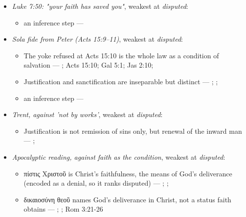 \documentclass[11pt]{article}
\begin{document}
\begin{itemize}
\begin{itemize}
\item an inference step --- \cite[Trent, Session VI (1547), canon 9]{tanner-decrees-1990}
\item an inference step --- \cite{gathercole-where-boasting-2002}; \cite{carson-variegated-nomism-1-2001}
\end{itemize}
\item \emph{Luke 7:50: "your faith has saved you"}, weakest at \emph{disputed}:
\begin{itemize}
\item an inference step --- \cite[Trent, Session VI (1547), canon 9]{tanner-decrees-1990}
\end{itemize}
\item \emph{Sola fide from Peter (Acts 15:9–11)}, weakest at \emph{disputed}:
\begin{itemize}
\item The yoke refused at Acts 15:10 is the whole law as a condition of salvation --- \cite[ad loc. Acts 15:10]{bruce-acts-1988}; Acts 15:10; Gal 5:1; Jas 2:10; \cite{das-paul-law-covenant-2001}
\item Justification and sanctification are inseparable but distinct --- \cite[XIII.1]{westminster-confession-1647}; \cite[XI.1]{westminster-confession-1647}; \cite[III.xi.6]{calvin-institutes-1960}
\item an inference step --- \cite[Trent, Session VI (1547), canon 9]{tanner-decrees-1990}
\end{itemize}
\item \emph{Trent, against 'not by works'}, weakest at \emph{disputed}:
\begin{itemize}
\item Justification is not remission of sins only, but renewal of the inward man --- \cite[Trent, Session VI (1547), Decree on Justification, ch. 7]{tanner-decrees-1990}; \cite[Trent, Session VI (1547), canon 11]{tanner-decrees-1990}
\end{itemize}
\item \emph{Apocalyptic reading, against faith as the condition}, weakest at \emph{disputed}:
\begin{itemize}
\item πίστις Χριστοῦ is Christ's faithfulness, the means of God's deliverance (encoded as a denial, so it ranks disputed) --- \cite{campbell-deliverance-god-2009}; \cite[ad loc. Gal 2:16]{martyn-galatians-1997}; \cite{hays-faith-jesus-christ-2002}
\item δικαιοσύνη θεοῦ names God's deliverance in Christ, not a status faith obtains --- \cite{campbell-deliverance-god-2009}; \cite{martyn-galatians-1997}; Rom 3:21-26

\end{itemize}
\end{itemize}
\end{document}
